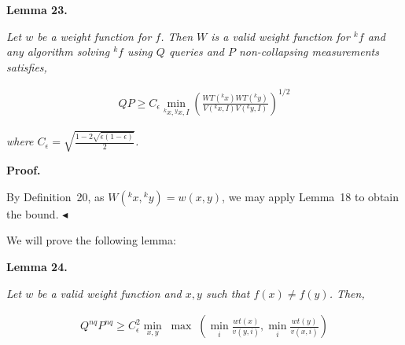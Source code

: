 

\par\medskip\noindent\textbf{
\textbf{Lemma 23}\textbf{.}
}\par



\emph{Let $w$ be a weight function for $f$. Then $W$ is a valid weight function for ${}^{k}f$ and any algorithm solving ${}^{k}f$ using $Q$ queries and $P$ non-collapsing measurements satisfies,}\par


\[\begin{gathered}
\displaystyle QP\geq C_{\epsilon}\min_{{}^{k}x,{}^{y}x,I}\left(\frac{WT({}^{k}x)WT({}^{k}y)}{V({}^{k}x,I)V({}^{k}y,I)}\right)^{1/2}
\end{gathered}\]


\emph{where $C_{\epsilon}=\sqrt{\frac{1-2\sqrt{\epsilon(1-\epsilon)}}{2}}$.}\par






\par\medskip\noindent\textbf{Proof.}\par




By Definition 20, as $W({}^{k}x,{}^{k}y)=w(x,y)$, we may apply Lemma 18 to obtain the bound.
$\blacktriangleleft$\par




We will prove the following lemma:\par





\par\medskip\noindent\textbf{
\textbf{Lemma 24}\textbf{.}
}\par



\emph{Let $w$ be a valid weight function and $x,y$ such that $f(x)\neq f(y)$. Then,}\par


\[\begin{gathered}
\displaystyle Q^{nq}P^{nq}\geq C^{2}_{\epsilon}\min_{x,y}\;\max\;\left(\min_{i}\frac{wt(x)}{v(y,i)},\min_{i}\frac{wt(y)}{v(x,i)}\right)
\end{gathered}\]







